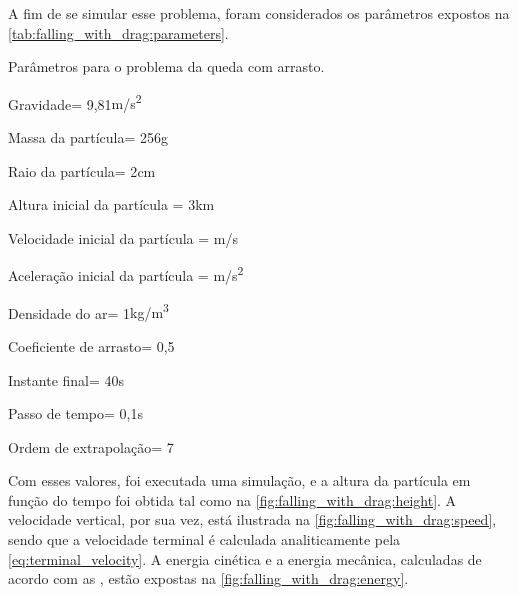 A fim de se simular esse problema, foram considerados os parâmetros expostos na \cref{tab:falling_with_drag:parameters}. 

\begin{table}[h]
\centering
\caption{Parâmetros para o problema da queda com arrasto.}
\label{tab:falling_with_drag:parameters}
\begin{parametersdesc}{0.8\textwidth}
	\item{Gravidade}{\gravityScalar = 9,81}{\si[per-mode=symbol]{\metre\per\square\second}}
	\hline
	\item{Massa da partícula}{\mass = 256}{\si\gram}
	\item{Raio da partícula}{\radius = 2}{\si\centi\metre}
	\item{Altura inicial da partícula}{\initial{\positiony} = 3}{\si{\kilo\metre}}
	\item{Velocidade inicial da partícula}{\explicitVector{\initial{\velocityx}}{\initial{\velocityy}}{\initial{\velocityz}} = }{\si[per-mode=symbol]{\metre\per\second}}
	\item{Aceleração inicial da partícula}{\explicitVector{\initial{\accelerationx}}{\initial{\accelerationy}}{\initial{\accelerationz}} = }{\si[per-mode=symbol]{\metre\per\square\second}}
	\hline
	\item{Densidade do ar}{\specificMass = 1}{\si[per-mode=symbol]{\kilogram\per\cubic\meter}}
	\item{Coeficiente de arrasto}{\dragCoefficient = 0,5}{\emptyUnit}
	\hline
	\item{Instante final}{\finalInstant = 40}{\si\second} 
	\item{Passo de tempo}{\Dt = 0,1}{\si\second}
	\item{Ordem de extrapolação}{\taylorOrder = 7}{\emptyUnit}
\end{parametersdesc}
\sourceMe 
\end{table}

Com esses valores, foi executada uma simulação, e a altura da partícula em função do tempo foi obtida tal como na \cref{fig:falling_with_drag:height}. A velocidade vertical, por sua vez, está ilustrada na \cref{fig:falling_with_drag:speed}, sendo que a velocidade terminal é calculada analiticamente pela \cref{eq:terminal_velocity}. A energia cinética e a energia mecânica, calculadas de acordo com as  , estão expostas na \cref{fig:falling_with_drag:energy}.

